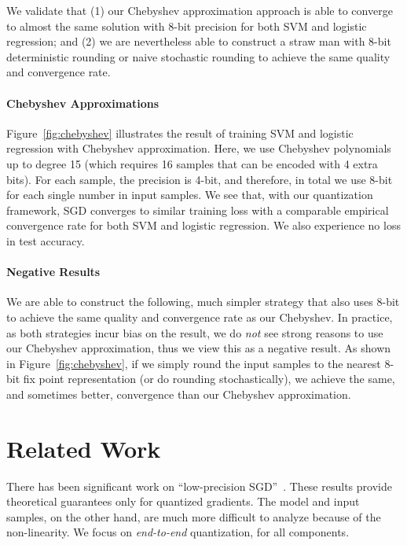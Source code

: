 \documentclass{article}
\begin{document}
We validate that (1) our Chebyshev 
approximation approach is able to
converge to almost the same solution 
with 8-bit precision for both SVM
and logistic regression;
and (2) we are nevertheless able to construct
a straw man with 8-bit deterministic 
rounding or naive stochastic rounding
to achieve the same quality and convergence 
rate.

\vspace{-0.5em}
\paragraph{Chebyshev Approximations}

Figure~\ref{fig:chebyshev} illustrates
the result of training SVM
and logistic regression 
with Chebyshev approximation. Here,
we use Chebyshev polynomials up to
degree 15 (which requires 16 samples
that can be encoded with 4 extra 
bits). For each sample, the precision
is 4-bit, and therefore, in total
we use 8-bit for each single number
in input samples. We see that, 
with our quantization framework,
SGD converges to similar training loss 
with a comparable empirical convergence 
rate for both SVM and logistic regression.
We also experience no loss in test accuracy.



\vspace{-0.5em}
\paragraph{Negative Results}

We are able to construct the following,
much simpler strategy that also
uses 8-bit to achieve the same quality
and convergence rate as our
Chebyshev. In practice, as both
strategies incur bias on the result,
we do {\em not} see strong reasons to
use our Chebyshev approximation, thus
we view this as a negative result.
As shown in Figure~\ref{fig:chebyshev},
if we simply round the input samples
to the nearest 8-bit fix point
representation (or do rounding
stochastically), we achieve the
same, and sometimes better,
convergence than our Chebyshev 
approximation.

\vspace{-0.5em}
\section{Related Work} 
\vspace{-0.5em}

There has been significant work on ``low-precision SGD''~\cite{DeSa:NIPS:2015,Alistarh:2016:ArXiv}. 
These results provide
theoretical guarantees only for quantized gradients.
The model and input samples, on the other hand, are much more difficult
to analyze because of the non-linearity. We focus on {\em end-to-end}
quantization, for all components.
\end{document}
